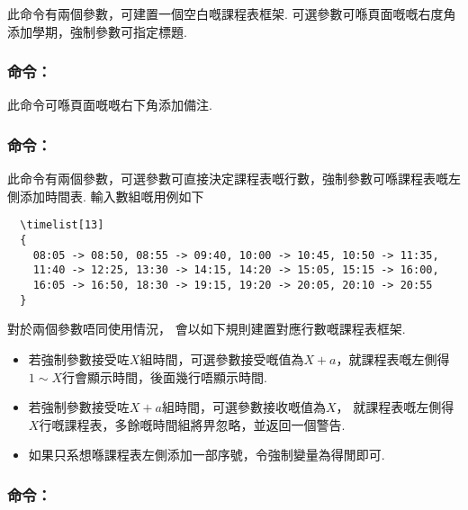 \documentclass[letterpaper]{l3doc}
\newenvironment{example}{\begin{list}{}{\leftmargin=\parindent}\item }{\end{list}}
\begin{document}
\begin{example}
  \qquad
\end{example}

此命令有兩個參數，可建置一個空白嘅課程表框架. 可選參數可喺頁面嘅嘅右度角添加學期，強制參數可指定標題.

\subsubsection{命令：}

\begin{example}
\end{example}

此命令可喺頁面嘅嘅右下角添加備注.

\subsubsection{命令：}

\begin{example}
  \qquad
\end{example}

此命令有兩個參數，可選參數可直接決定課程表嘅行數，強制參數可喺課程表嘅左側添加時間表. 輸入數組嘅用例如下

\begin{Verbatim}
  \timelist[13]
  {
    08:05 -> 08:50, 08:55 -> 09:40, 10:00 -> 10:45, 10:50 -> 11:35,
    11:40 -> 12:25, 13:30 -> 14:15, 14:20 -> 15:05, 15:15 -> 16:00,
    16:05 -> 16:50, 18:30 -> 19:15, 19:20 -> 20:05, 20:10 -> 20:55
  }
\end{Verbatim}

對於兩個參數唔同使用情況， 會以如下規則建置對應行數嘅課程表框架.

\begin{itemize}
  \item 若強制參數接受咗$X$組時間，可選參數接受嘅值為$X+a$，就課程表嘅左側得$1 \sim X$行會顯示時間，後面幾行唔顯示時間.
  \item 若強制參數接受咗$X+a$組時間，可選參數接收嘅值為$X$， 就課程表嘅左側得$X$行嘅課程表，多餘嘅時間組將畀忽略，並返回一個警告.
  \item 如果只系想喺課程表左側添加一部序號，令強制變量為得閒即可.
\end{itemize}

\subsubsection{命令：}
\end{document}
